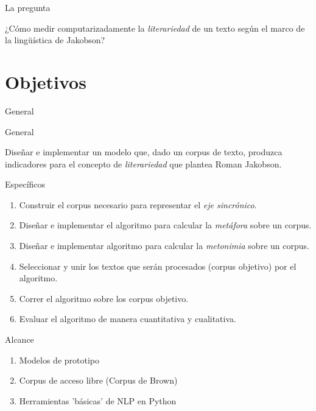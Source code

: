 \documentclass[presentation]{beamer}
\begin{document}
\begin{frame}[label={sec:org39eeff1}]{La pregunta}
\begin{block}{}
   ¿Cómo medir
   computarizadamente la \emph{literariedad} de un texto según el marco de la
   lingüística de Jakobson?
\end{block}
\end{frame}




\section{Objetivos}
\label{sec:org2c3f000}
\begin{frame}[label={sec:org406ad68}]{General}
   \begin{block}{General}

Diseñar e implementar un modelo que, dado un corpus de texto, produzca
   indicadores para el concepto de \emph{literariedad} que plantea Roman Jakobson.
     \end{block}
\end{frame}

\begin{frame}[label={sec:orgf028025}]{Específicos}
\begin{enumerate}
\item Construir el corpus necesario para representar el \emph{eje sincrónico}.
\item Diseñar e implementar el algoritmo para calcular la \emph{metáfora} sobre un corpus.
\item Diseñar e implementar algoritmo para calcular la \emph{metonimia} sobre un corpus.
\item Seleccionar y unir los textos que serán procesados (corpus objetivo) por el algoritmo.
\item Correr el algoritmo sobre los corpus objetivo.
\item Evaluar el algoritmo de manera cuantitativa y cualitativa.
\end{enumerate}
\end{frame}

\begin{frame}[label={sec:org98a8141}]{Alcance}
\begin{enumerate}
\item Modelos de prototipo

\item Corpus de acceso libre (Corpus de Brown)

\item Herramientas 'básicas' de NLP en Python
\end{enumerate}
\end{frame}
\end{document}
